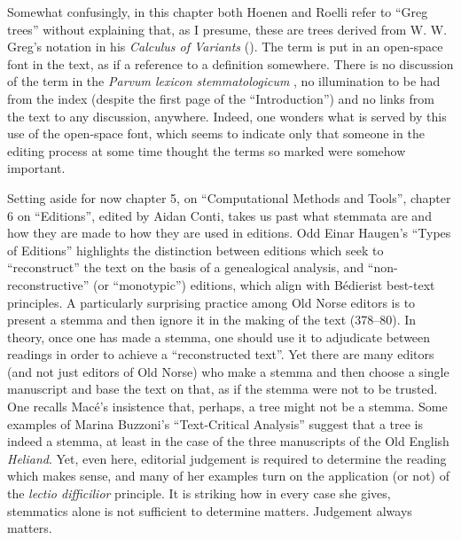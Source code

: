 \documentclass{article}
\begin{document}
Somewhat confusingly, in this chapter both Hoenen and Roelli
refer to ``Greg trees'' without explaining that, as I presume, these are
trees derived from W. W. Greg's notation in his \emph{Calculus of
Variants} (\citeyear{greg_calculus_1927}). The term is put in an open-space font in the text, as
if a reference to a definition somewhere. There is no discussion of the
term in the \emph{Parvum lexicon stemmatologicum} \parencite{roelli_parvum_2015}, no illumination to be had from the index (despite the first page
of the ``Introduction'') and no links from the text to any discussion,
anywhere. Indeed, one wonders what is served by this use of the
open-space font, which seems to indicate only that someone in the
editing process at some time thought the terms so marked were somehow
important.

Setting aside for now chapter 5, on ``Computational Methods and
Tools'', chapter 6 on ``Editions'', edited by Aidan Conti, takes us past
what stemmata are and how they are made to how they are used in
editions. Odd Einar Haugen's ``Types of Editions'' highlights the
distinction between editions which seek to ``reconstruct'' the text on
the basis of a genealogical analysis, and ``non-reconstructive'' (or
``monotypic'') editions, which align with Bédierist best-text
principles. A particularly surprising practice among Old Norse editors
is to present a stemma and then ignore it in the making of the text
(378--80). In theory, once one has made a stemma, one should use it to
adjudicate between readings in order to achieve a ``reconstructed
text''. Yet there are many editors (and not just editors of Old Norse)
who make a stemma and then choose a single manuscript and base the text
on that, as if the stemma were not to be trusted. One recalls Macé's
insistence that, perhaps, a tree might not be a stemma. Some examples of
Marina Buzzoni's ``Text-Critical Analysis'' suggest that a tree is
indeed a stemma, at least in the case of the three manuscripts of the
Old English \emph{Heliand}. Yet, even here, editorial judgement is
required to determine the reading which makes sense, and many of her
examples turn on the application (or not) of the \emph{lectio
difficilior} principle. It is striking how in every case she gives,
stemmatics alone is not sufficient to determine matters. Judgement
always matters.
\end{document}

